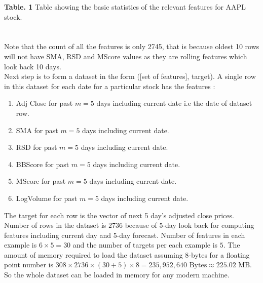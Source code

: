 \documentclass[10pt]{report}
\begin{document}
\textbf{Table. 1} Table showing the basic statistics of the relevant features for AAPL stock.\\
\\
\\
Note that the count of all the features is only 2745, that is because oldest 10 rows will not have SMA, RSD and MScore values as they are rolling features which look back 10 days.\\
Next step is to form a dataset in the form ([set of features], target). A single row in this dataset for each date for a particular stock has the features :
\begin{enumerate}
\item Adj Close for past $m=5$ days including current date i.e the date of dataset row.
\item SMA for past $m=5$ days including current date.
\item RSD for past $m=5$ days including current date.
\item BBScore for past $m=5$ days including current date.
\item MScore for past $m=5$ days including current date.
\item LogVolume for past $m=5$ days including current date.
\end{enumerate}
The target for each row is the vector of next 5 day's adjusted close prices. Number of rows in the dataset is $2736$ because of  5-day look back for computing features including current day and 5-day forecast. Number of features in each example is $6 \times 5 = 30$ and the number of targets per each example is $5$. The amount of memory required to load the dataset assuming 8-bytes for a floating point number is $ 308 \times 2736 \times ( 30  +  5 ) \times 8 = 235,952,640 \text{ Bytes} \approx 225.02 \text{ MB}$. So the whole dataset can be loaded in memory for any modern machine.
\end{document}
